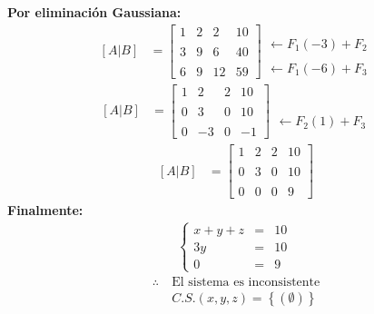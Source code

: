 \documentclass[10pt, a4paper]{article}
\begin{document}
\textbullet\textbf{Por eliminación Gaussiana:}
\begin{align*}
  \left[A|B\right]&=\left[
    \begin{array}{ccc|c}
      1 & 2 & 2 & 10 \\\\
      3 & 9 & 6 & 40 \\\\
      6 & 9 & 12 & 59
    \end{array}
  \right]
  \begin{array}{r}
    \\\\
    \leftarrow F_1\left(-3\right)+F_2 \\\\
    \leftarrow F_1\left(-6\right)+F_3
  \end{array}
\end{align*}
\begin{align*}
  \left[A|B\right]&=\left[
    \begin{array}{ccc|c}
      1 & 2 & 2 & 10 \\\\
      0 & 3 & 0 & 10 \\\\
      0 & -3 & 0 & -1
    \end{array}
  \right]
  \begin{array}{r}
    \\\\
    \\\\
    \leftarrow F_2\left(1\right)+F_3
  \end{array}
\end{align*}
\begin{align*}
  \left[A|B\right]&=\left[
    \begin{array}{ccc|c}
      1 & 2 & 2 & 10 \\\\
      0 & 3 & 0 & 10 \\\\
      0 & 0 & 0 & 9
    \end{array}
  \right]
\end{align*}
\textbullet\textbf{Finalmente:}
\begin{align*}
  \left\{
  \begin{array}{rcl}
    x+y+z &= &10\\
    3y &= &10\\
    0 &= &9
  \end{array}
  \right.\
\end{align*}
\begin{align*}
  \therefore \ &\text{El sistema es inconsistente}\\
  &C.S. \left(x,y,z\right) = \left\{\left(\emptyset\right)\right\}
\end{align*}
\end{document}
